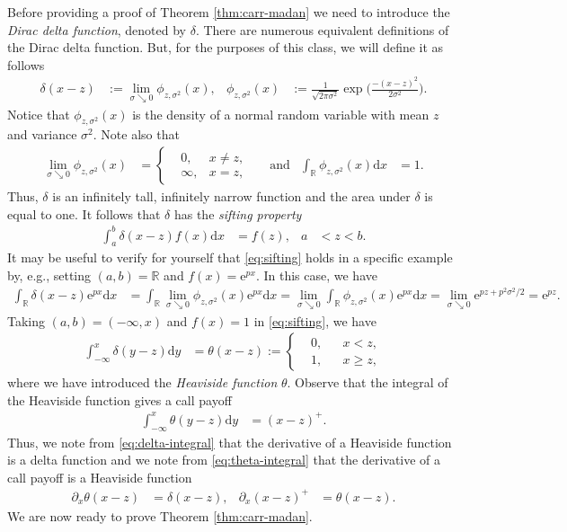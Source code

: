 \documentclass[12pt]{book}
\numberwithin{equation}{chapter}
\theoremstyle{plain}
\numberwithin{theorem}{section}
\theoremstyle{definition}
\numberwithin{exercise}{chapter}
\newcommand{\<}{\langle}
\renewcommand{\>}{\rangle}
\renewcommand{\(}{\left(}
\renewcommand{\)}{\right)}
\renewcommand{\[}{\left[}
\renewcommand{\]}{\right]}
\newcommand\Rb{\mathds{R}}
\newcommand\sig{\sigma}
\newcommand\del{\delta}
\renewcommand\d{\partial}
\newcommand\dd{\mathrm{d}}
\newcommand\ee{\mathrm{e}}
\theoremstyle{definition}
\numberwithin{question}{section}
\begin{document}
\noindent
Before providing a proof of Theorem \ref{thm:carr-madan} we need to introduce 
the \textit{Dirac delta function}, denoted by $\delta$.
There are numerous equivalent definitions of the Dirac delta function.  But, for the purposes of this class, we will define it as follows
\begin{align}
\del(x-z)
	&:= \lim_{\sig \searrow 0} \phi_{z,\sig^2}(x) , &
\phi_{z,\sig^2}(x)
	&:=	\frac{1}{\sqrt{2 \pi \sig^2}} \exp \Big( \frac{-(x-z)^2}{2 \sig^2} \Big) .
\end{align}
Notice that $\phi_{z,\sig^2}(x)$ is the density of a normal random variable with mean $z$ and variance $\sig^2$.  Note also that
\begin{align}
\lim_{\sig \searrow 0} \phi_{z,\sig^2}(x)
	&=	\left\{ \begin{aligned} 
	&	0 ,	&		x \neq z , \\
	&	\infty , & x = z , 
	\end{aligned} \right. &
	&\text{and}&
\int_\Rb \phi_{z,\sig^2}(x) \dd x
	&= 1 .
\end{align}
Thus, $\del$ is an infinitely tall, infinitely narrow function and the area under $\del$ is equal to one.  It follows that $\del$ has the \textit{sifting property}
\begin{align}
\int_a^b \del(x-z) f(x) \dd x
	&=	f(z) , &
a
	&< z < b . \label{eq:sifting}
\end{align}
It may be useful to verify for yourself that \eqref{eq:sifting} holds in a specific example by, e.g., setting $(a,b) = \Rb$ and $f(x) = \ee^{p x}$.  In this case, we have
\begin{align}
\int_\Rb \del(x-z) \ee^{p x} \dd x
	&=	\int_\Rb \lim_{\sigma \searrow 0} \phi_{z,\sig^2}(x) \ee^{p x} \dd x
	=		\lim_{\sigma \searrow 0} \int_\Rb \phi_{z,\sig^2}(x) \ee^{p x} \dd x
	=		\lim_{\sigma \searrow 0} \ee^{p z + p^2 \sig^2 / 2}
	=		\ee^{p z} .
\end{align} 
Taking $(a,b) = (-\infty,x)$ and $f(x) = 1$ in \eqref{eq:sifting}, we have
\begin{align}
\int_{- \infty}^x \del(y-z) \dd y
	&=	\theta(x - z)
	:=	\left\{ \begin{aligned}
			&0 , && x < z , \\
			&1 , && x \geq z ,
			\end{aligned} \right. \label{eq:delta-integral}
\end{align}
where we have introduced the \textit{Heaviside function} $\theta$.  Observe that the integral of the Heaviside function gives a call payoff
\begin{align}
\int_{- \infty}^x \theta(y-z) \dd y
	&=	(x - z)^+ . \label{eq:theta-integral}
\end{align}
Thus, we note from \eqref{eq:delta-integral} that the derivative of a Heaviside function is a delta function and we note from \eqref{eq:theta-integral} that the derivative of a call payoff is a Heaviside function
\begin{align}
\d_x \theta(x-z)
	&=	\del(x-z) , &
\d_x (x - z)^+
	&=	\theta(x - z) .
\end{align}
We are now ready to prove Theorem \ref{thm:carr-madan}.
\end{document}
